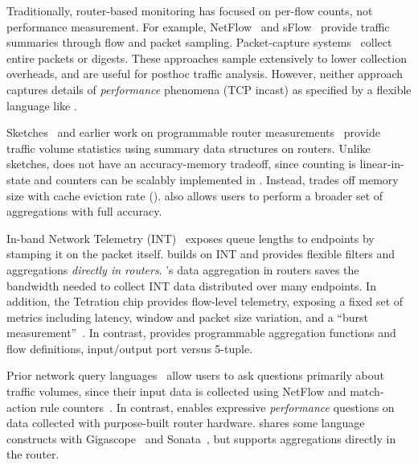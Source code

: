  Traditionally, router-based monitoring has
focused on per-flow counts, not performance measurement. For example,
NetFlow~\cite{netflow} and sFlow~\cite{sflow} provide traffic summaries
through flow and packet sampling. Packet-capture systems~\cite{cisco-span,
niksun, netsight, everflow, pathdump, path_query} collect entire packets or
digests. These approaches sample extensively to lower collection
overheads, and are useful for posthoc traffic analysis. However, neither
approach captures details of {\em performance} phenomena (\eg TCP incast) as
specified by a flexible language like \TheSystem.

 Sketches~\cite{univmon, flowradar, counterbraids, dream} and
earlier work on programmable router measurements~\cite{progme, opensketch}
provide traffic volume statistics using summary data structures on routers.
Unlike sketches, \TheSystem does not have an accuracy-memory tradeoff, since
counting is linear-in-state and counters can be scalably implemented in \TheSystem. Instead,
\TheSystem trades off memory size with cache eviction rate ().
\TheSystem also allows users to perform a broader set of aggregations with full
accuracy.


%

In-band Network Telemetry (INT)~\cite{int, tpp} exposes queue lengths to
endpoints by stamping it on the packet itself. \TheSystem builds on INT and
provides flexible filters and aggregations {\em directly in routers}.
\TheSystem's data aggregation in routers saves the bandwidth needed to collect
INT data distributed over many endpoints.  In addition, the Tetration chip
provides flow-level telemetry, exposing a fixed set of metrics including
latency, window and packet size variation, and a ``burst
measurement''~\cite{tetration-telemetry}. In contrast, \TheSystem provides
programmable aggregation functions and flow definitions, \eg input/output port versus 5-tuple.

 Prior network query languages~\cite{gigascope,
frenetic, path_query, streaming-monitoring} allow users to ask questions
primarily about traffic volumes, since their input data is
collected using NetFlow and match-action rule counters~\cite{openflow}. In
contrast, \TheSystem enables expressive {\em performance} questions on
data collected with purpose-built router hardware. \TheSystem shares some
language constructs with Gigascope~\cite{gigascope} and
Sonata~\cite{streaming-monitoring}, but supports aggregations directly in the
router.

